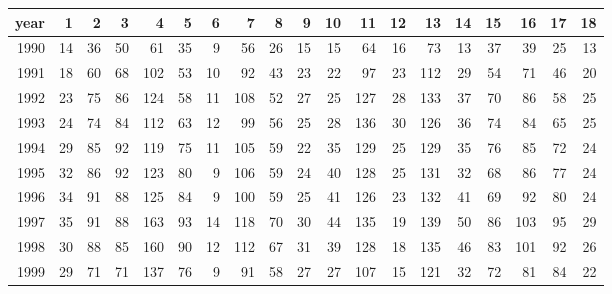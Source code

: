\begin{tabular}{rrrrrrrrrrrrrrrrrrr}
  \hline
  \textbf{year} & \textbf{ 1} & \textbf{ 2} & \textbf{ 3} & \textbf{ 4} & \textbf{ 5} & \textbf{ 6} & \textbf{ 7} & \textbf{ 8} & \textbf{ 9} & \textbf{ 10} & \textbf{ 11} & \textbf{ 12} & \textbf{ 13} & \textbf{ 14} & \textbf{ 15} & \textbf{ 16} & \textbf{ 17} & \textbf{ 18} \\
\hline
  1990 & 14 & 36 & 50 & 61 & 35 & 9 & 56 & 26 & 15 & 15 & 64 & 16 & 73 & 13 & 37 & 39 & 25 & 13 \\
  1991 & 18 & 60 & 68 & 102 & 53 & 10 & 92 & 43 & 23 & 22 & 97 & 23 & 112 & 29 & 54 & 71 & 46 & 20 \\
  1992 & 23 & 75 & 86 & 124 & 58 & 11 & 108 & 52 & 27 & 25 & 127 & 28 & 133 & 37 & 70 & 86 & 58 & 25 \\
  1993 & 24 & 74 & 84 & 112 & 63 & 12 & 99 & 56 & 25 & 28 & 136 & 30 & 126 & 36 & 74 & 84 & 65 & 25 \\
  1994 & 29 & 85 & 92 & 119 & 75 & 11 & 105 & 59 & 22 & 35 & 129 & 25 & 129 & 35 & 76 & 85 & 72 & 24 \\
  1995 & 32 & 86 & 92 & 123 & 80 & 9 & 106 & 59 & 24 & 40 & 128 & 25 & 131 & 32 & 68 & 86 & 77 & 24 \\
  1996 & 34 & 91 & 88 & 125 & 84 & 9 & 100 & 59 & 25 & 41 & 126 & 23 & 132 & 41 & 69 & 92 & 80 & 24 \\
  1997 & 35 & 91 & 88 & 163 & 93 & 14 & 118 & 70 & 30 & 44 & 135 & 19 & 139 & 50 & 86 & 103 & 95 & 29 \\
  1998 & 30 & 88 & 85 & 160 & 90 & 12 & 112 & 67 & 31 & 39 & 128 & 18 & 135 & 46 & 83 & 101 & 92 & 26 \\
  1999 & 29 & 71 & 71 & 137 & 76 & 9 & 91 & 58 & 27 & 27 & 107 & 15 & 121 & 32 & 72 & 81 & 84 & 22 \\\hline
\end{tabular}
